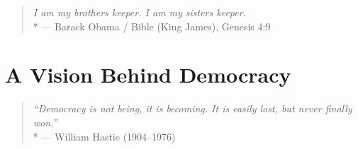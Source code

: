 






\begin{quote}
	\emph{I am my brothers keeper. I am my sisters keeper.}\\*
	--- Barack Obama / Bible (King James), Genesis 4:9
\end{quote}

\section{A Vision Behind Democracy}

\begin{quote}
	\emph{``Democracy is not being, it is becoming. It is easily lost, but never finally won.''}\\*
	--- William Hastie (1904--1976)
\end{quote}

